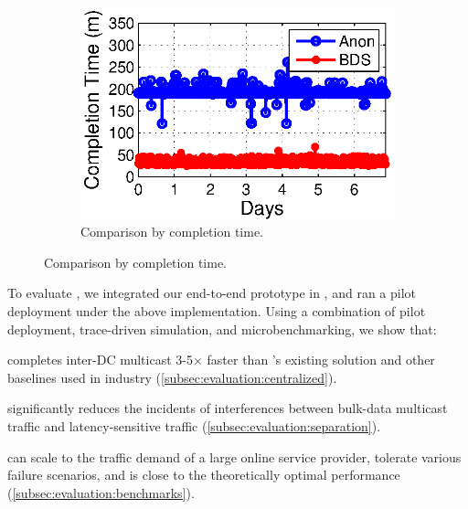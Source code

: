\begin{figure}[t]
\begin{subfigure}[b]{0.3\textwidth}
                \label{fig:BDSvsAnon:FCT}
        \end{subfigure}
        \begin{subfigure}[b]{0.3\textwidth}
                \centering
                \includegraphics[width=\textwidth]{images/BDSvsAnon_time.eps}
                \caption{Comparison by completion time.}
                \label{fig:BDSvsAnon:time}
        \end{subfigure}
        \label{fig:BDSvsAnon}
\vspace{-0.4cm}
\end{figure}

To evaluate \name, we integrated our end-to-end prototype in \company, and ran a pilot deployment under the above implementation.
Using a combination of pilot deployment, trace-driven simulation, and microbenchmarking, we show that:
\begin{packedenumerate}
\item \name completes inter-DC multicast 3-5$\times$ faster than \company's existing solution and other baselines used in industry (\Section\ref{subsec:evaluation:centralized}).
\item \name significantly reduces the incidents of interferences between bulk-data multicast traffic and latency-sensitive traffic (\Section\ref{subsec:evaluation:separation}).
\item \name can scale to the traffic demand of a large online service provider, tolerate various failure scenarios, and is close to the theoretically optimal performance (\Section\ref{subsec:evaluation:benchmarks}).
\end{packedenumerate}


